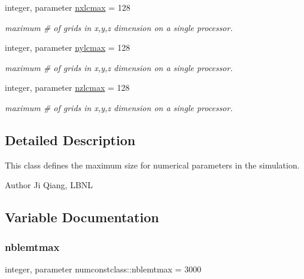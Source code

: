 \begin{DoxyCompactItemize}
\item 
integer, parameter \mbox{\hyperlink{namespacenumconstclass_a8219d90b9dea3ecb8b630e32e3c86026}{nxlcmax}} = 128
\begin{DoxyCompactList}\small\item\em maximum \# of grids in x,y,z dimension on a single processor. \end{DoxyCompactList}\item 
integer, parameter \mbox{\hyperlink{namespacenumconstclass_ab087d448ac5f3b93904c966d5790fdf2}{nylcmax}} = 128
\begin{DoxyCompactList}\small\item\em maximum \# of grids in x,y,z dimension on a single processor. \end{DoxyCompactList}\item 
integer, parameter \mbox{\hyperlink{namespacenumconstclass_a11dbfc82160f0abca94e67bc7811d3ea}{nzlcmax}} = 128
\begin{DoxyCompactList}\small\item\em maximum \# of grids in x,y,z dimension on a single processor. \end{DoxyCompactList}\end{DoxyCompactItemize}



\subsection{Detailed Description}
This class defines the maximum size for numerical parameters in the simulation. 

\begin{DoxyAuthor}{Author}
Ji Qiang, L\+B\+NL 
\end{DoxyAuthor}


\subsection{Variable Documentation}
\mbox{\label{namespacenumconstclass_a83ab51ec1dd55c167600999fca072524}} 
\subsubsection{\texorpdfstring{nblemtmax}{nblemtmax}}
{\footnotesize\ttfamily integer, parameter numconstclass\+::nblemtmax = 3000}



